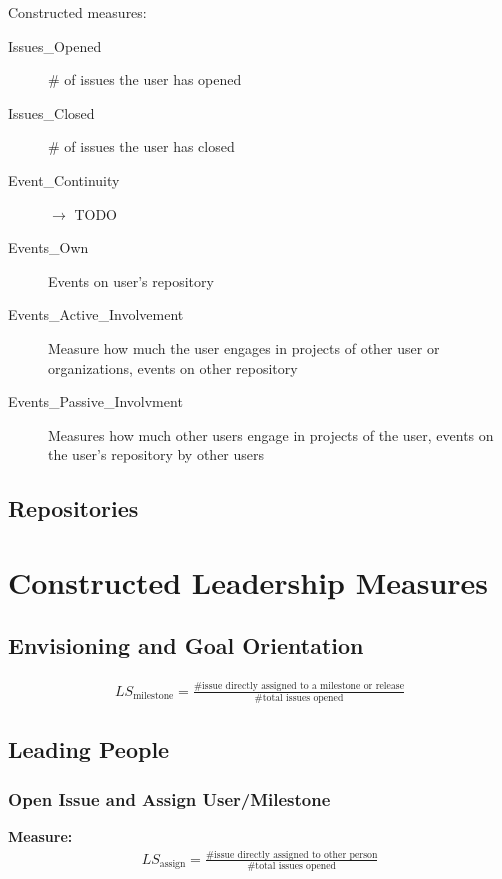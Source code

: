 \documentclass[a4paper,10pt]{article}
\begin{document}
Constructed measures:
\begin{description}
 \item [Issues\_Opened] \# of issues the user has opened
 \item [Issues\_Closed] \# of issues the user has closed
\item [Event\_Continuity] $\to$ TODO
\item [Events\_Own] Events on user's repository
\item [Events\_Active\_Involvement] Measure how much the user engages in projects of other user or organizations, events on other repository
\item [Events\_Passive\_Involvment] Measures how much other users engage in projects of the user, events on the user's repository by other users
\end{description}



\subsection{Repositories}



\section{Constructed Leadership Measures}
\subsection{Envisioning and Goal Orientation}

\begin{align}
 LS_{\text{milestone}} = \frac{\text{\# issue directly assigned to a milestone or release}}{\text{\# total issues opened}} 
\end{align}




\subsection{Leading People}
\subsubsection{Open Issue and Assign  User/Milestone}

\textbf{Measure:}
\begin{align}
 LS_{\text{assign}} = \frac{\text{\# issue directly assigned to other person}}{\text{\# total issues opened}} 
\end{align}
\end{document}

